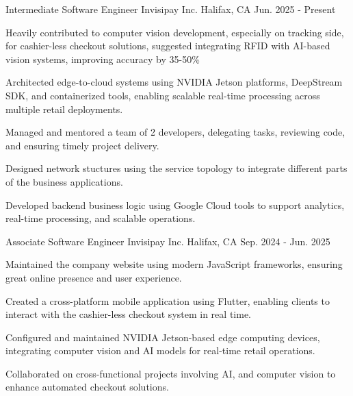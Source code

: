 

\begin{cventries}

  \cventry
    {Intermediate Software Engineer} %
    {Invisipay Inc.} %
    {Halifax, CA} %
    {Jun. 2025 - Present} %
    {
      \begin{cvitems} %
        \item {Heavily contributed to computer vision development, especially on tracking side, for cashier-less checkout solutions, suggested integrating RFID with AI-based vision systems, improving accuracy by 35-50\%}
        \item {Architected edge-to-cloud systems using NVIDIA Jetson platforms, DeepStream SDK, and containerized tools, enabling scalable real-time processing across multiple retail deployments.}
        \item {Managed and mentored a team of 2 developers, delegating tasks, reviewing code, and ensuring timely project delivery.}
        \item {Designed network stuctures using the service topology to integrate different parts of the business applications.}
        \item {Developed backend business logic using Google Cloud tools to support analytics, real-time processing, and scalable operations.}
      \end{cvitems}
    }

  \cventry
    {Associate Software Engineer} %
    {Invisipay Inc.} %
    {Halifax, CA} %
    {Sep. 2024 - Jun. 2025} %
    {
      \begin{cvitems} %
        \item {Maintained the company website using modern JavaScript frameworks, ensuring great online presence and user experience.}
        \item {Created a cross-platform mobile application using Flutter, enabling clients to interact with the cashier-less checkout system in real time.}
        \item {Configured and maintained NVIDIA Jetson-based edge computing devices, integrating computer vision and AI models for real-time retail operations.}
        \item {Collaborated on cross-functional projects involving AI, and computer vision to enhance automated checkout solutions.}
      \end{cvitems}
    }


\end{cventries}
